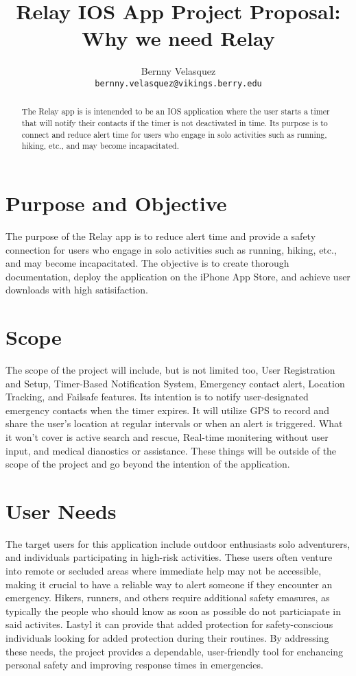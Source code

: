 \documentclass{article} %
\title{Relay IOS App Project Proposal: Why we need Relay}
\author{
Bernny Velasquez \\
\texttt{bernny.velasquez@vikings.berry.edu} \\
}
\begin{document}
\maketitle

\begin{abstract}
The Relay app is is intenended to be an IOS application where the user starts a timer that will notify their contacts if the timer is not deactivated in time. Its purpose is to connect and reduce alert time for users who engage in solo activities such as running, hiking, etc., and may become incapacitated. 

\end{abstract}

\section{Purpose and Objective}
The purpose of the Relay app is to reduce alert time and provide a safety connection for users who engage in solo activities such as running, hiking, etc., and may become incapacitated. The objective is to create thorough documentation, deploy the application on the iPhone App Store, and achieve user downloads with high satisifaction. 

\section{Scope} The scope of the project will include, but is not limited too, User Registration and Setup, Timer-Based Notification System, Emergency contact alert, Location Tracking, and Failsafe features. Its intention is to notify user-designated emergency contacts when the timer expires. It will utilize GPS to record and share the user's location at regular intervals or when an alert is triggered. What it won't cover is active search and rescue, Real-time monitering without user input, and medical dianostics or assistance. These things will be outside of the scope of the project and go beyond the intention of the application. 

\section{User Needs} The target users for this application include outdoor enthusiasts solo adventurers, and individuals participating in high-risk activities. These users often venture into remote or secluded areas where immediate help may not be accessible, making it crucial to have a reliable way to alert someone if they encounter an emergency. Hikers, runners, and others require additional safety emasures, as typically the people who should know as soon as possible do not particiapate in said activites. Lastyl it can provide that added protection for safety-conscious individuals looking for added protection during their routines. By addressing these needs, the project provides a dependable, user-friendly tool for enchancing personal safety and improving response times in emergencies. 
\newpage
\end{document}
